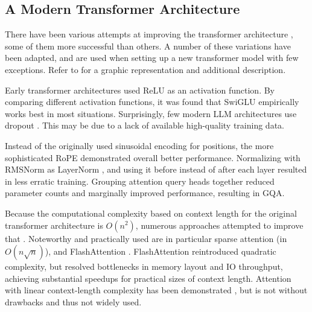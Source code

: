 

\subsection{A Modern Transformer Architecture}\label{sub:modern}

There have been various attempts at improving the transformer architecture \cite{shazeer_glu_2020, su_roformer_2022, ainslie_gqa_2023, bolya_hydra_2022, sukhbaatar_adaptive_2019, lu_understanding_2019, ye_understanding_2023, wu_memorizing_2022}, some of them more successful than others.
A number of these variations have been adapted, and are used when setting up a new transformer model with few exceptions.
Refer to  for a graphic representation and additional description.

Early transformer architectures used \gls{ReLU} as an activation function. By comparing different activation functions, it was found that \gls{SwiGLU} empirically works best in most situations. %
Surprisingly, few modern \gls{LLM} architectures use dropout \cite{srivastava_dropout_2014}.
This may be due to a lack of available high-quality training data.

Instead of the originally used sinusoidal encoding for positions, the more sophisticated \gls{RoPE} demonstrated overall better performance.
Normalizing with RMSNorm as LayerNorm \cite{ba_layer_2016}, and using it before instead of after each layer resulted in less erratic training.
Grouping attention query heads together reduced parameter counts and marginally improved performance, resulting in \gls{GQA}.

Because the computational complexity based on context length for the original transformer architecture is $O(n^2)$, numerous approaches attempted to improve that \cite{child_generating_2019, wu_fastformer_2021, bolya_hydra_2022, hua_transformer_2022, dao_flashattention_2022}.
Noteworthy and practically used are in particular sparse attention \cite{child_generating_2019} (in $O(n\sqrt{n})$), and FlashAttention \cite{dao_flashattention_2022}.
FlashAttention reintroduced quadratic complexity, but resolved bottlenecks in memory layout and IO throughput, achieving substantial speedups for practical sizes of context length.
Attention with linear context-length complexity has been demonstrated \cite{wu_fastformer_2021, hua_transformer_2022}, but is not without drawbacks and thus not widely used.


